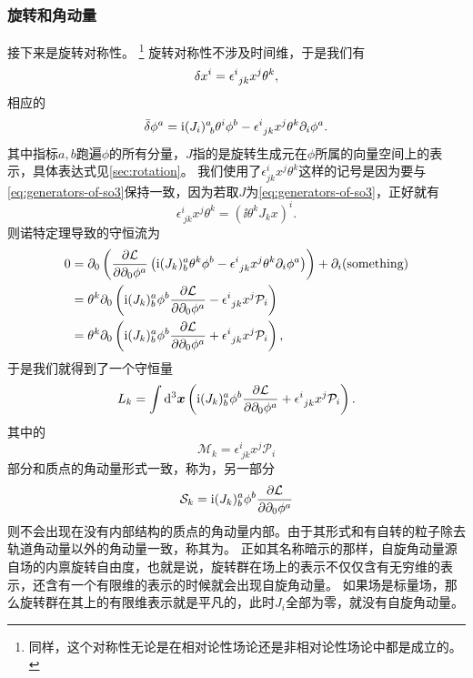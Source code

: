 \subsubsection{旋转和角动量}

接下来是旋转对称性。%
\footnote{同样，这个对称性无论是在相对论性场论还是非相对论性场论中都是成立的。}%
旋转对称性不涉及时间维，于是我们有
\[
    \var{x^i} = \epsilon^i_{\ jk}  x^j \theta^k,
\]
相应的
\[
    \bar{\var}{\phi^a} = \mathrm{i} (J_i)^a_{\ b} \theta^i \phi^b - \epsilon^i_{\ jk}  x^j \theta^k \partial_i \phi^a.
\]
其中指标$a,b$跑遍$\phi$的所有分量，$J$指的是旋转生成元在$\phi$所属的向量空间上的表示，具体表达式见\autoref{sec:rotation}。
我们使用了$\epsilon^i_{jk}  x^j \theta^k$这样的记号是因为要与\eqref{eq:generators-of-so3}保持一致，因为若取$J$为\eqref{eq:generators-of-so3}，正好就有
\[
    \epsilon^i_{\ jk}  x^j \theta^k = (\ii \theta^k J_k x)^i.
\]
则诺特定理导致的守恒流为
\[
    \begin{aligned}
        0 &= \partial_0 \left( \pdv{\mathcal{L}}{\partial_0 \phi^a} \left( \mathrm{i} (J_k)^a_b \theta^k \phi^b - \epsilon^i_{\ jk}  x^j \theta^k \partial_i \phi^a \right) \right) + \partial_i (\text{something}) \\
        &= \theta^k \partial_0 \left( \mathrm{i} (J_k)^a_b \phi^b \pdv{\mathcal{L}}{\partial_0 \phi^a} - \epsilon^i_{\ jk} x^j \mathcal{P}_i \right) \\
        &= \theta^k \partial_0 \left( \mathrm{i} (J_k)^a_b \phi^b \pdv{\mathcal{L}}{\partial_0 \phi^a} + \epsilon^i_{\ jk} x^j \mathcal{P}_i \right),
    \end{aligned}
\]
于是我们就得到了一个守恒量 %
\begin{equation}
    L_k = \int \dd[3]{\vb*{x}} \left( \mathrm{i} (J_k)^a_b \phi^b \pdv{\mathcal{L}}{\partial_0 \phi^a} + \epsilon^i_{\ jk} x^j \mathcal{P}_i \right).
    \label{eq:field-angular-momentum}
\end{equation}
其中的
\begin{equation}
    \mathcal{M}_k = \epsilon^i_{\ jk} x^j \mathcal{P}_i 
\end{equation}
部分和质点的角动量形式一致，称为，另一部分
\begin{equation}
    \mathcal{S}_k = \mathrm{i} (J_k)^a_b \phi^b \pdv{\mathcal{L}}{\partial_0 \phi^a}
    \label{eq:spin-angular-momentum}
\end{equation}
则不会出现在没有内部结构的质点的角动量内部。由于其形式和有自转的粒子除去轨道角动量以外的角动量一致，称其为。
正如其名称暗示的那样，自旋角动量源自场的内禀旋转自由度，也就是说，旋转群在场上的表示不仅仅含有无穷维的表示，还含有一个有限维的表示的时候就会出现自旋角动量。
如果场是标量场，那么旋转群在其上的有限维表示就是平凡的，此时$J_i$全部为零，就没有自旋角动量。

